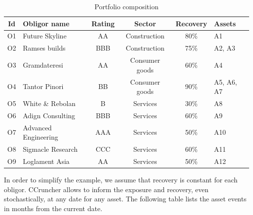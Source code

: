 \documentclass[a4paper,12pt,final]{article}
\begin{document}
\begin{table}[!h]
\begin{center}
\begin{tabular}[]{c|l|c|c|c|l}
Id  & Obligor name         & Rating & Sector         & Recovery & Assets     \\
\hline
O1  & Future Skyline       & AA     & Construction   & 80\%     & A1         \\
O2  & Ramses builds        & BBB    & Construction   & 75\%     & A2, A3     \\
O3  & Gramdateresi         & AA     & Consumer goods & 60\%     & A4         \\
O4  & Tantor Pinori        & BB     & Consumer goods & 90\%     & A5, A6, A7 \\
O5  & White \& Rebolan     & B      & Services       & 30\%     & A8         \\
O6  & Adign Consulting     & BBB    & Services       & 60\%     & A9         \\
O7  & Advanced Engineering & AAA    & Services       & 50\%     & A10        \\
O8  & Sigmacle Research    & CCC    & Services       & 60\%     & A11        \\
O9  & Loglament Asia       & AA     & Services       & 50\%     & A12        \\
\end{tabular}
\caption{Portfolio composition}
\label{example.portfolio}
\end{center}
\end{table}
In order to simplify the example, we assume that recovery is constant for each 
obligor. CCruncher allows to inform the exposure and recovery, even stochastically,
at any date for any asset. The following table lists the asset events in months 
from the current date.
\end{document}
